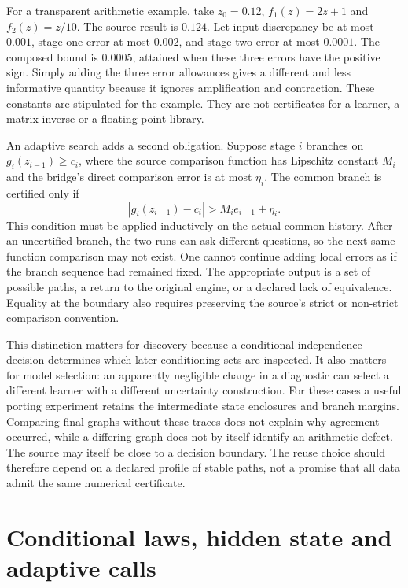 For a transparent arithmetic example, take $z_0=0.12$,
$f_1(z)=2z+1$ and $f_2(z)=z/10$. The source result is $0.124$. Let input
discrepancy be at most $0.001$, stage-one error at most $0.002$, and
stage-two error at most $0.0001$. The composed bound is $0.0005$, attained
when these three errors have the positive sign. Simply adding the three
error allowances gives a different and less informative quantity because it
ignores amplification and contraction. These constants are stipulated for
the example. They are not certificates for a learner, a matrix inverse or
a floating-point library.

An adaptive search adds a second obligation. Suppose stage $i$ branches on
$g_i(z_{i-1})\geq c_i$, where the source comparison function has Lipschitz
constant $M_i$ and the bridge's direct comparison error is at most $\eta_i$.
The common branch is certified only if
\begin{equation}
 |g_i(z_{i-1})-c_i|>M_i e_{i-1}+\eta_i.
 \label{exec17:s9-composed-branch}
\end{equation}
This condition must be applied inductively on the actual common history.
After an uncertified branch, the two runs can ask different questions, so the
next same-function comparison may not exist. One cannot continue adding local
errors as if the branch sequence had remained fixed. The appropriate output is
a set of possible paths, a return to the original engine, or a declared lack
of equivalence. Equality at the boundary also requires preserving the source's
strict or non-strict comparison convention.

This distinction matters for discovery because a conditional-independence
decision determines which later conditioning sets are inspected. It also
matters for model selection: an apparently negligible change in a diagnostic
can select a different learner with a different uncertainty construction.
For these cases a useful porting experiment retains the intermediate state
enclosures and branch margins. Comparing final graphs without these traces
does not explain why agreement occurred, while a differing graph does not by
itself identify an arithmetic defect. The source may itself be close to a
decision boundary. The reuse choice should therefore depend on a declared
profile of stable paths, not a promise that all data admit the same numerical
certificate.

\section{Conditional laws, hidden state and adaptive calls}
\label{exec17:s9-adaptive-kernels}

